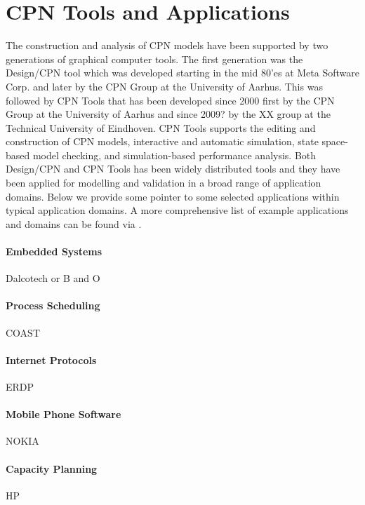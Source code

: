 
\section{CPN Tools and Applications}

The construction and analysis of CPN models have been supported by two
generations of graphical computer tools. The first generation was the
Design/CPN tool \cite{X} which was developed starting in the mid 80'es
at Meta Software Corp. and later by the CPN Group at the University of
Aarhus. This was followed by CPN Tools \cite{Y} that has been
developed since 2000 first by the CPN Group at the University of
Aarhus and since 2009? by the XX group at the Technical University of
Eindhoven. CPN Tools supports the editing and construction of CPN
models, interactive and automatic simulation, state space-based model
checking, and simulation-based performance analysis. Both Design/CPN
and CPN Tools has been widely distributed tools and they have been
applied for modelling and validation in a broad range of application
domains. Below we provide some pointer to some selected applications
within typical application domains. A more comprehensive list of
example applications and domains can be found via \cite{X}.

\paragraph{Embedded Systems} Dalcotech or B and O

\paragraph{Process Scheduling} COAST

\paragraph{Internet Protocols} ERDP

\paragraph{Mobile Phone Software} NOKIA

\paragraph{Capacity Planning} HP

